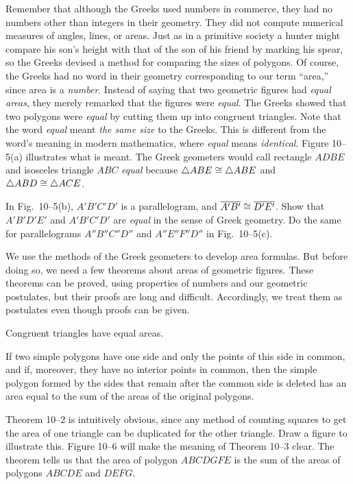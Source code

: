 \documentclass[11pt]{book}
\begin{document}
Remember that although the Greeks used numbers in commerce, they had no numbers
other than integers in their geometry. They did not compute numerical measures
of angles, lines, or areas. Just as in a primitive society a hunter might
compare his son's height with that of the son of his friend by marking his
spear, so the Greeks devised a method for comparing the sizes of polygons. Of
course, the Greeks had no word in their geometry corresponding to our term
``area,'' since area is a \emph{number}. Instead of saying that two geometric
figures had \emph{equal areas}, they merely remarked that the figures were
\emph{equal}. The Greeks showed that two polygons were \emph{equal} by cutting
them up into congruent triangles. Note that the word \emph{equal} meant
\emph{the same size} to the Greeks. This is different from the word's meaning
in modern mathematics, where \emph{equal} means \emph{identical}. Figure
10--5(a) illustrates what is meant. The Greek geometers would call rectangle
$ADBE$ and isosceles triangle $ABC$ \emph{equal} because
$\triangle ABE \cong \triangle ABE$ and $\triangle ABD \cong \triangle ACE$.

\FIGXFIVE

\noindent In Fig.~10--5(b), $A'B'C'D'$ is a parallelogram, and
$\overline{A'B'} \cong \overline{D'E'}$. Show that $A'B'D'E'$ and $A'B'C'D'$ are
\emph{equal} in the sense of Greek geometry. Do the same for parallelograms
$A''B''C''D''$ and $A''E''F''D''$ in Fig.~10--5(c).

\medskip
We use the methods of the Greek geometers to develop area formulas. But before
doing so, we need a few theorems about areas of geometric figures. These
theorems can be proved, using properties of numbers and our geometric
postulates, but their proofs are long and difficult. Accordingly, we treat them
as postulates even though proofs can be given.

\begin{theorem}
Congruent triangles have equal areas.
\end{theorem}

\begin{theorem}
If two simple polygons have one side and only the points of this side in
common, and if, moreover, they have no interior points in common, then the
simple polygon formed by the sides that remain after the common side is
deleted has an area equal to the sum of the areas of the original polygons.
\end{theorem}

Theorem 10--2 is intuitively obvious, since any method of counting squares to
get the area of one triangle can be duplicated for the other triangle. Draw a
figure to illustrate this. Figure 10--6 will make the meaning of Theorem 10--3
clear. The theorem tells us that the area of polygon $ABCDGFE$ is the sum of
the areas of polygons $ABCDE$ and $DEFG$.
\end{document}
